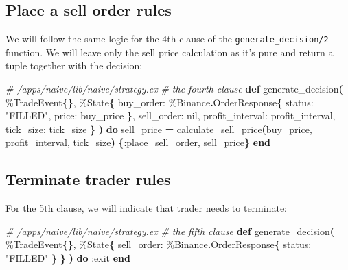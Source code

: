 \documentclass[
  oneside]{book}
\newenvironment{Shaded}{\begin{snugshade}}{\end{snugshade}}
\newcommand{\CommentTok}[1]{\textcolor[rgb]{0.56,0.35,0.01}{\textit{#1}}}
\newcommand{\ConstantTok}[1]{\textcolor[rgb]{0.56,0.35,0.01}{#1}}
\newcommand{\FunctionTok}[1]{\textcolor[rgb]{0.13,0.29,0.53}{\textbf{#1}}}
\newcommand{\KeywordTok}[1]{\textcolor[rgb]{0.13,0.29,0.53}{\textbf{#1}}}
\newcommand{\NormalTok}[1]{#1}
\newcommand{\OperatorTok}[1]{\textcolor[rgb]{0.81,0.36,0.00}{\textbf{#1}}}
\newcommand{\StringTok}[1]{\textcolor[rgb]{0.31,0.60,0.02}{#1}}
\newcommand{\VariableTok}[1]{\textcolor[rgb]{0.00,0.00,0.00}{#1}}
\begin{document}
\subsection{Place a sell order rules}\label{place-a-sell-order-rules}

We will follow the same logic for the 4th clause of the \texttt{generate\_decision/2} function. We will leave only the sell price calculation as it's pure and return a tuple together with the decision:

\begin{Shaded}
\begin{Highlighting}[]
\CommentTok{\# /apps/naive/lib/naive/strategy.ex}
\CommentTok{\# the fourth clause}
  \KeywordTok{def}\NormalTok{ generate\_decision}\FunctionTok{(}
\NormalTok{        \%}\ConstantTok{TradeEvent}\FunctionTok{\{\}}\NormalTok{,}
\NormalTok{        \%}\ConstantTok{State}\FunctionTok{\{}
          \VariableTok{buy\_order:}\NormalTok{ \%}\ConstantTok{Binance}\OperatorTok{.}\ConstantTok{OrderResponse}\FunctionTok{\{}
            \VariableTok{status:} \StringTok{"FILLED"}\NormalTok{,}
            \VariableTok{price:}\NormalTok{ buy\_price}
          \FunctionTok{\}}\NormalTok{,}
          \VariableTok{sell\_order:} \ConstantTok{nil}\NormalTok{,}
          \VariableTok{profit\_interval:}\NormalTok{ profit\_interval,}
          \VariableTok{tick\_size:}\NormalTok{ tick\_size}
        \FunctionTok{\}}
      \FunctionTok{)} \KeywordTok{do}
\NormalTok{    sell\_price }\OperatorTok{=}\NormalTok{ calculate\_sell\_price}\FunctionTok{(}\NormalTok{buy\_price, profit\_interval, tick\_size}\FunctionTok{)}
    \FunctionTok{\{}\VariableTok{:place\_sell\_order}\NormalTok{, sell\_price}\FunctionTok{\}}
  \KeywordTok{end}
\end{Highlighting}
\end{Shaded}

\subsection{Terminate trader rules}\label{terminate-trader-rules}

For the 5th clause, we will indicate that trader needs to terminate:

\begin{Shaded}
\begin{Highlighting}[]
\CommentTok{\# /apps/naive/lib/naive/strategy.ex}
\CommentTok{\# the fifth clause}
  \KeywordTok{def}\NormalTok{ generate\_decision}\FunctionTok{(}
\NormalTok{        \%}\ConstantTok{TradeEvent}\FunctionTok{\{\}}\NormalTok{,}
\NormalTok{        \%}\ConstantTok{State}\FunctionTok{\{}
          \VariableTok{sell\_order:}\NormalTok{ \%}\ConstantTok{Binance}\OperatorTok{.}\ConstantTok{OrderResponse}\FunctionTok{\{}
            \VariableTok{status:} \StringTok{"FILLED"}
          \FunctionTok{\}}
        \FunctionTok{\}}
      \FunctionTok{)} \KeywordTok{do}
    \VariableTok{:exit}
  \KeywordTok{end}
\end{Highlighting}
\end{Shaded}
\end{document}
